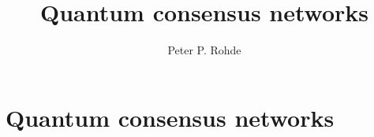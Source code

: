 \documentclass[twocolumn, aps, amsmath, amssymb, nofootinbib, superscriptaddress, longbibliography, floatfix, eqsecnum, rmp]{revtex4-2}
\begin{document}
\title{Quantum consensus networks}

\author{Peter P. Rohde}

\maketitle

\section{Quantum consensus networks} \label{sec:QCN}



\end{document}
